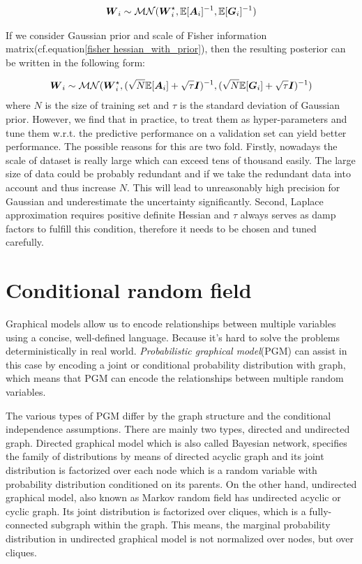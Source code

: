 \begin{equation}
\begin{aligned} \label{mvg}
\boldsymbol W_{i} \sim \mathcal{MN}(\boldsymbol W_i^\star, \mathbb E[\boldsymbol A_i]^{-1}, \mathbb E[\boldsymbol G_i]^{-1})
\end{aligned}
\end{equation}

If we consider Gaussian prior and scale of Fisher information matrix(cf.equation\ref{fisher hessian_with_prior}), then the resulting posterior can be written in the following form:

\begin{equation}
\begin{aligned} \label{mvg_prior}
\boldsymbol W_{i} \sim \mathcal{MN}(\boldsymbol W_i^\star, (\sqrt{N} \mathbb E[\boldsymbol A_i]+\sqrt{\tau}\boldsymbol I)^{-1}, (\sqrt{N}\mathbb E[\boldsymbol G_i]+\sqrt{\tau}\boldsymbol I)^{-1})
\end{aligned}
\end{equation} 
where $N$ is the size of training set and $\tau$ is the standard deviation of Gaussian prior.
However, we find that in practice, to treat them as hyper-parameters and tune them w.r.t. the predictive performance on a validation set can yield better performance. The possible reasons for this are two fold. Firstly, nowadays the scale of dataset is really large which can exceed tens of thousand easily. The large size of data could be probably redundant and if we take the redundant data into account and thus increase $N$. This will lead to unreasonably high precision for Gaussian and underestimate the uncertainty significantly. Second, Laplace approximation requires positive definite Hessian and $\tau$ always serves as damp factors to fulfill this condition, therefore it needs to be chosen and tuned carefully.    


\section{Conditional random field}
Graphical models allow us to encode relationships between multiple variables using a concise, well-defined language. Because it's hard to solve the problems deterministically in real world. \textit{Probabilistic graphical model}(PGM)\cite{koller2009probabilistic} can assist in this case by encoding a joint or conditional probability distribution with graph, which means that PGM can encode the relationships between multiple random variables. 

The various types of PGM differ by the graph structure and the conditional independence assumptions. There are mainly two types, directed and undirected graph. Directed graphical model which is also called Bayesian network, specifies the family of distributions by means of directed acyclic graph and its joint distribution is factorized over each node which is a random variable with probability distribution conditioned on its parents. On the other hand, undirected graphical model, also known as Markov random field has undirected acyclic or cyclic graph. Its joint distribution is factorized over cliques, which is a fully-connected subgraph within the graph. This means, the marginal probability distribution in undirected graphical model is not normalized over nodes, but over cliques. 


